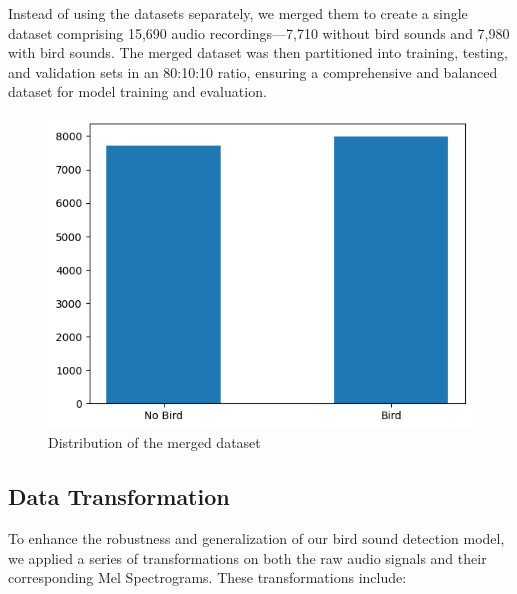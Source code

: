       \newpage
      Instead of using the datasets separately, we merged them to create a single dataset comprising 15,690 audio recordings—7,710 without bird sounds and 7,980 
      with bird sounds. The merged dataset was then partitioned into training, testing, and validation sets in an 80:10:10 ratio, ensuring a comprehensive and 
      balanced dataset for model training and evaluation.
      \begin{figure}[h!]
            \centering
            \includegraphics[scale=0.75]{images/dataset_detection-3.png}
            \caption{Distribution of the merged dataset}
            \label{fig:merged_dataset}
      \end{figure}         \newpage      

      \subsection{Data Transformation}
      To enhance the robustness and generalization of our bird sound detection model, we applied a series of transformations on both the raw audio signals and 
      their corresponding Mel Spectrograms. These transformations include:

